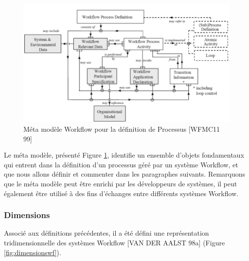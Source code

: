  	 
 	 
 	 
\begin{figure}[h]
	\centering
	\includegraphics[width=0.7\linewidth]{images/MetaMWFMC11-99}
	\caption{Méta modèle Workflow pour la définition de Processus [WFMC11 99]}
	\label{fig:metamwfmc11-99}
\end{figure}
 	 
 	 Le méta modèle, présenté Figure \ref{fig:metamwfmc11-99}, identifie un ensemble d’objets fondamentaux qui entrent dans la définition d’un processus géré par un système Workflow, et que nous allons définir et commenter dans les paragraphes suivants. Remarquons que le méta modèle peut être enrichi par les développeurs de systèmes, il peut également être utilisé à des fins d’échanges entre différents systèmes Workflow.
 	 
 	 
 	 \subsubsection{Dimensions}
 	 Associé aux définitions précédentes, il a été défini une représentation tridimensionnelle des systèmes Workflow [VAN DER AALST 98a] (Figure \ref{fig:dimensionswf}). 
 	 
